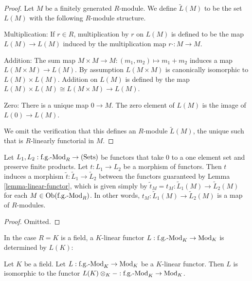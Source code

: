 \begin{proof}
Let $M$ be a finitely generated $R$-module. We define $\widetilde{L}(M)$ to be 
the set $L(M)$ with the following $R$-module structure.

\medskip \noindent
Multiplication: If $r \in R$, multiplication by $r$ on $L(M)$ is defined to be 
the map $L(M) \rightarrow L(M)$ induced by the multiplication map $r \cdot: M 
\rightarrow M$.

\medskip \noindent
Addition: The sum map $M \times M \rightarrow M: (m_1,m_2) \mapsto m_1 + m_2$ 
induces a map $L(M \times M) \rightarrow L(M)$. By assumption $L(M \times M)$ 
is canonically isomorphic to $L(M) \times L(M)$.  Addition on $L(M)$ is defined 
by the map $L(M) \times L(M) \cong L(M \times M) \rightarrow L(M)$.

\medskip \noindent
Zero: There is a unique map $0 \rightarrow M$.  The zero element of $L(M)$ is 
the image of $L(0) \rightarrow L(M)$.

\medskip \noindent
We omit the verification that this defines an $R$-module $\widetilde{L}(M)$, 
the unique such that is $R$-linearly functorial in $M$.
\end{proof}

\begin{lemma}
\label{lemma-morphism-linear-functors}
Let $L_1,L_2: \textnormal{f.g.-Mod}_R \rightarrow \textnormal{(Sets)}$ be 
functors that take $0$ to a one element set and preserve finite products.  Let 
$t: L_1 \rightarrow L_2$ be a morphism of functors. Then $t$ induces a morphism 
$\widetilde{t}: \widetilde{L}_1 \rightarrow \widetilde{L}_2$ between the 
functors guaranteed by Lemma \ref{lemma-linear-functor}, which is given simply 
by $\widetilde{t}_M = t_M: \widetilde{L}_1(M) \rightarrow \widetilde{L}_2(M)$ 
for each $M \in \textnormal{Ob}(\textnormal{f.g.-Mod}_{R})$. In other words, 
$t_M: \widetilde{L}_1(M) \rightarrow \widetilde{L}_2(M)$ is a map of 
$R$-modules.
\end{lemma}

\begin{proof}
Omitted.
\end{proof}

\noindent
In the case $R = K$ is a field, a $K$-linear functor $L: 
\textnormal{f.g.-Mod}_{K} \rightarrow \textnormal{Mod}_{K}$ is determined by 
$L(K)$:
\begin{lemma}
\label{lemma-linear-functor-over-field}
Let $K$ be a field. Let $L: \textnormal{f.g.-Mod}_{K} \rightarrow 
\textnormal{Mod}_{K}$ be a $K$-linear functor.  Then $L$ is isomorphic to the 
functor $L(K) \otimes_{K} - : \textnormal{f.g.-Mod}_{K} \rightarrow 
\textnormal{Mod}_{K}$.
\end{lemma}

